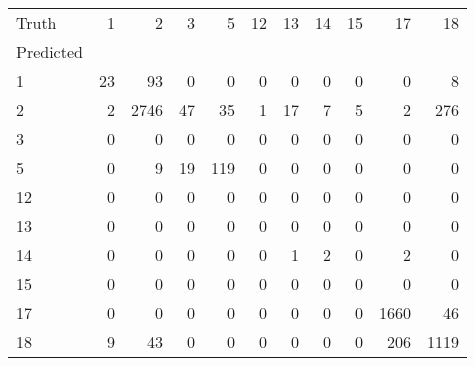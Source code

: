 \begin{tabular}{lrrrrrrrrrr}
\toprule
Truth & 1 & 2 & 3 & 5 & 12 & 13 & 14 & 15 & 17 & 18 \\
Predicted &  &  &  &  &  &  &  &  &  &  \\
\midrule
1 & 23 & 93 & 0 & 0 & 0 & 0 & 0 & 0 & 0 & 8 \\
2 & 2 & 2746 & 47 & 35 & 1 & 17 & 7 & 5 & 2 & 276 \\
3 & 0 & 0 & 0 & 0 & 0 & 0 & 0 & 0 & 0 & 0 \\
5 & 0 & 9 & 19 & 119 & 0 & 0 & 0 & 0 & 0 & 0 \\
12 & 0 & 0 & 0 & 0 & 0 & 0 & 0 & 0 & 0 & 0 \\
13 & 0 & 0 & 0 & 0 & 0 & 0 & 0 & 0 & 0 & 0 \\
14 & 0 & 0 & 0 & 0 & 0 & 1 & 2 & 0 & 2 & 0 \\
15 & 0 & 0 & 0 & 0 & 0 & 0 & 0 & 0 & 0 & 0 \\
17 & 0 & 0 & 0 & 0 & 0 & 0 & 0 & 0 & 1660 & 46 \\
18 & 9 & 43 & 0 & 0 & 0 & 0 & 0 & 0 & 206 & 1119 \\
\bottomrule
\end{tabular}
